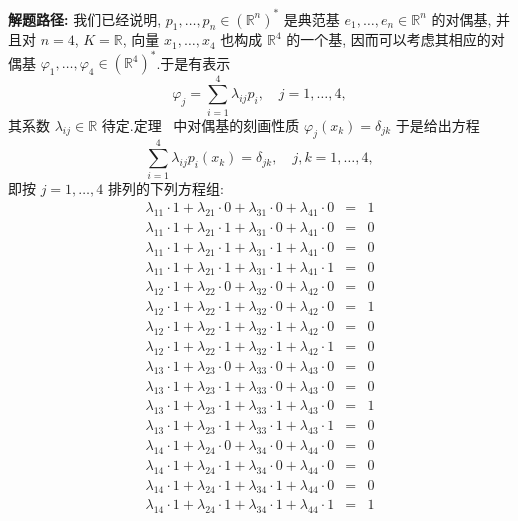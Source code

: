 \noindent\textbf{解题路径:} 我们已经说明, $p_1, \ldots, p_n \in (\mathbb{R}^n)^*$ 是典范基 $e_1, \ldots, e_n \in \mathbb{R}^n$ 的对偶基, 并且对 $n = 4$, $K = \mathbb{R}$, 向量 $x_1, \ldots, x_4$ 也构成 $\mathbb{R}^4$ 的一个基, 因而可以考虑其相应的对偶基 $\varphi_1, \ldots, \varphi_4 \in (\mathbb{R}^4)^*$.于是有表示
\[
\varphi_j = \sum_{i = 1}^{4} \lambda_{ij} p_i, \quad j = 1, \ldots, 4,
\]
其系数 $\lambda_{ij} \in \mathbb{R}$ 待定.定理~ 中对偶基的刻画性质 $\varphi_j(x_k) = \delta_{jk}$ 于是给出方程
\[
\sum_{i = 1}^{4} \lambda_{ij} p_i(x_k) = \delta_{jk}, \quad j, k = 1, \ldots, 4,
\]
即按 $j = 1, \ldots, 4$ 排列的下列方程组:
\[
\begin{array}{rcl}
\lambda_{11} \cdot 1 + \lambda_{21} \cdot 0 + \lambda_{31} \cdot 0 + \lambda_{41} \cdot 0 &=& 1\\
\lambda_{11} \cdot 1 + \lambda_{21} \cdot 1 + \lambda_{31} \cdot 0 + \lambda_{41} \cdot 0 &=& 0\\
\lambda_{11} \cdot 1 + \lambda_{21} \cdot 1 + \lambda_{31} \cdot 1 + \lambda_{41} \cdot 0 &=& 0\\
\lambda_{11} \cdot 1 + \lambda_{21} \cdot 1 + \lambda_{31} \cdot 1 + \lambda_{41} \cdot 1 &=& 0
\end{array}
\]
\[
\begin{array}{rcl}
\lambda_{12} \cdot 1 + \lambda_{22} \cdot 0 + \lambda_{32} \cdot 0 + \lambda_{42} \cdot 0 &=& 0\\
\lambda_{12} \cdot 1 + \lambda_{22} \cdot 1 + \lambda_{32} \cdot 0 + \lambda_{42} \cdot 0 &=& 1\\
\lambda_{12} \cdot 1 + \lambda_{22} \cdot 1 + \lambda_{32} \cdot 1 + \lambda_{42} \cdot 0 &=& 0\\
\lambda_{12} \cdot 1 + \lambda_{22} \cdot 1 + \lambda_{32} \cdot 1 + \lambda_{42} \cdot 1 &=& 0
\end{array}
\]
\[
\begin{array}{rcl}
\lambda_{13} \cdot 1 + \lambda_{23} \cdot 0 + \lambda_{33} \cdot 0 + \lambda_{43} \cdot 0 &=& 0\\
\lambda_{13} \cdot 1 + \lambda_{23} \cdot 1 + \lambda_{33} \cdot 0 + \lambda_{43} \cdot 0 &=& 0\\
\lambda_{13} \cdot 1 + \lambda_{23} \cdot 1 + \lambda_{33} \cdot 1 + \lambda_{43} \cdot 0 &=& 1\\
\lambda_{13} \cdot 1 + \lambda_{23} \cdot 1 + \lambda_{33} \cdot 1 + \lambda_{43} \cdot 1 &=& 0
\end{array}
\]
\[
\begin{array}{rcl}
\lambda_{14} \cdot 1 + \lambda_{24} \cdot 0 + \lambda_{34} \cdot 0 + \lambda_{44} \cdot 0 &=& 0\\
\lambda_{14} \cdot 1 + \lambda_{24} \cdot 1 + \lambda_{34} \cdot 0 + \lambda_{44} \cdot 0 &=& 0\\
\lambda_{14} \cdot 1 + \lambda_{24} \cdot 1 + \lambda_{34} \cdot 1 + \lambda_{44} \cdot 0 &=& 0\\
\lambda_{14} \cdot 1 + \lambda_{24} \cdot 1 + \lambda_{34} \cdot 1 + \lambda_{44} \cdot 1 &=& 1
\end{array}
\]
